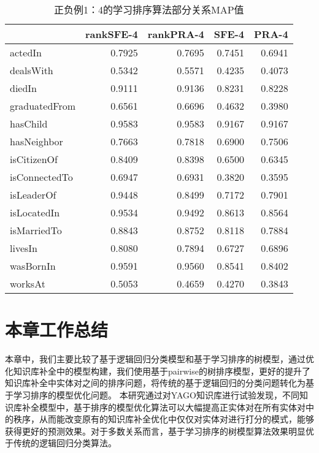 \begin{table}[htbp]
  \centering
  \caption{正负例1：4的学习排序算法部分关系MAP值}
    \begin{tabular}{|l|r|r|r|r|}
    \hline
          & \multicolumn{1}{l|}{rankSFE-4} & \multicolumn{1}{l|}{rankPRA-4} & \multicolumn{1}{l|}{SFE-4} & \multicolumn{1}{l|}{PRA-4} \bigstrut\\
    \hline
    actedIn                                                     & 0.7925  & 0.7695  & 0.7451  & 0.6941  \bigstrut\\
    \hline
    dealsWith                                                   & 0.5342  & 0.5571  & 0.4235  & 0.4073  \bigstrut\\
    \hline
    diedIn                                                      & 0.9111  & 0.9136  & 0.8231  & 0.8228  \bigstrut\\
    \hline
    graduatedFrom                                               & 0.6561  & 0.6696  & 0.4632  & 0.3980  \bigstrut\\
    \hline
    hasChild                                                    & 0.9583  & 0.9583  & 0.9167  & 0.9167  \bigstrut\\
    \hline
    hasNeighbor                                                 & 0.7663  & 0.7818  & 0.6900  & 0.7506  \bigstrut\\
    \hline
    isCitizenOf                                                 & 0.8409  & 0.8398  & 0.6500  & 0.6345  \bigstrut\\
    \hline
    isConnectedTo                                               & 0.6947  & 0.6931  & 0.3820  & 0.3595  \bigstrut\\
    \hline
    isLeaderOf                                                  & 0.9448  & 0.8499  & 0.7172  & 0.7901  \bigstrut\\
    \hline
    isLocatedIn                                                 & 0.9534  & 0.9492  & 0.8613  & 0.8564  \bigstrut\\
    \hline
    isMarriedTo                                                 & 0.8843  & 0.8752  & 0.8118  & 0.7884  \bigstrut\\
    \hline
    livesIn                                                     & 0.8080  & 0.7894  & 0.6727  & 0.6896  \bigstrut\\
    \hline
    wasBornIn                                                   & 0.9591  & 0.9560  & 0.8541  & 0.8402  \bigstrut\\
    \hline
    worksAt                                                     & 0.5053  & 0.4659  & 0.4270  & 0.3843  \bigstrut\\
    \hline
    \end{tabular}%
  \label{tab:kbc-yago-rank4}%
\end{table}%

\section{本章工作总结}
本章中，我们主要比较了基于逻辑回归分类模型和基于学习排序的树模型，通过优化知识库补全中的模型构建，我们使用基于pairwise的树排序模型，更好的提升了知识库补全中实体对之间的排序问题，将传统的基于逻辑回归的分类问题转化为基于学习排序的模型优化问题。
本研究通过对YAGO知识库进行试验发现，不同知识库补全模型中，基于排序的模型优化算法可以大幅提高正实体对在所有实体对中的秩序，从而能改变原有的知识库补全优化中仅仅对实体对进行打分的模式，能够获得更好的预测效果。对于多数关系而言，基于学习排序的树模型算法效果明显优于传统的逻辑回归分类算法。
